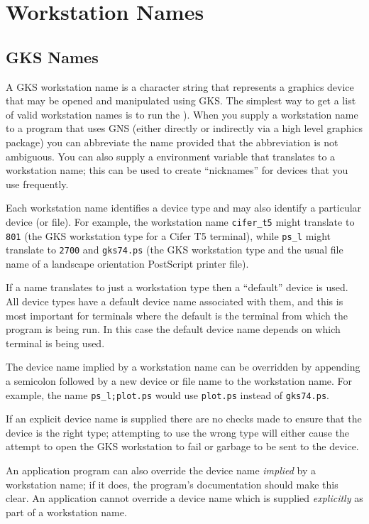\documentclass[twoside,11pt,nolof]{starlink}
\begin{document}
\section{Workstation Names}\label{wn}
\subsection{GKS Names}

A GKS workstation name is a character string that represents a graphics device
that may be opened and manipulated using GKS.
The simplest way to get a list of valid workstation names is to run the
).
When you supply a workstation name to a program that uses GNS (either directly
or indirectly via a high level graphics package) you can abbreviate the name
provided that the abbreviation is not ambiguous. You can also supply a
environment variable that translates to a workstation name; this can be
used to create ``nicknames'' for devices that you use frequently.

Each workstation name identifies a device type and may also identify a
particular device (or file). For example, the workstation name \texttt{cifer\_t5}
might translate to \texttt{801} (the GKS workstation type for a Cifer T5
terminal), while \texttt{ps\_l} might translate to \texttt{2700} and \texttt{gks74.ps}
(the GKS workstation type and the usual file name of a landscape
orientation PostScript printer file).

If a name translates to just a workstation type then a  ``default'' device
is used. All device types have a default device name associated with them,
and this is most important for terminals where the default is the terminal
from which the program is being run. In this case the default device name
depends on which terminal is being used.

The device name implied by a workstation name can be overridden by
appending a semicolon followed by a new device or file name to the
workstation name. For example, the name \texttt{ps\_l;plot.ps} would use \texttt{plot.ps} instead of \texttt{gks74.ps}.

If an explicit device name is supplied there are no checks made to ensure
that the device is the right type; attempting to use the wrong type will
either cause the attempt to open the GKS workstation to fail or garbage to
be sent to the device.

An application program can also override the device name \emph{implied\/} by a
workstation name; if it does, the program's documentation should make this
clear. An application cannot override a device name which is supplied
\emph{explicitly\/} as part of a workstation name.
\end{document}
